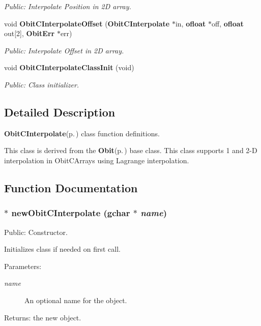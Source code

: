 \begin{CompactItemize}
\begin{CompactList}\small\item\em Public: Interpolate Position in 2D array. \item\end{CompactList}\item 
void {\bf Obit\-CInterpolate\-Offset} ({\bf Obit\-CInterpolate} $\ast$in, {\bf ofloat} $\ast$off, {\bf ofloat} out[2], {\bf Obit\-Err} $\ast$err)
\begin{CompactList}\small\item\em Public: Interpolate Offset in 2D array. \item\end{CompactList}\item 
void {\bf Obit\-CInterpolate\-Class\-Init} (void)
\begin{CompactList}\small\item\em Public: Class initializer. \item\end{CompactList}\end{CompactItemize}


\subsection{Detailed Description}
{\bf Obit\-CInterpolate}{\rm (p.\,\pageref{structObitCInterpolate})} class function definitions. 

This class is derived from the {\bf Obit}{\rm (p.\,\pageref{structObit})} base class. This class supports 1 and 2-D interpolation in Obit\-CArrays using Lagrange interpolation.

\subsection{Function Documentation}
\subsubsection{$\ast$ new\-Obit\-CInterpolate (gchar $\ast$ {\em name})}\label{ObitCInterpolate_8c_a9}


Public: Constructor. 

Initializes class if needed on first call. \begin{Desc}
\item[Parameters:]
\begin{description}
\item[{\em name}]An optional name for the object. \end{description}
\end{Desc}
\begin{Desc}
\item[Returns:]the new object. \end{Desc}
